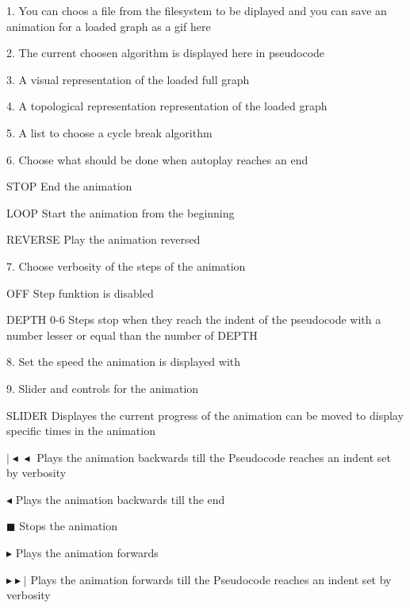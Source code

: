 \begin{list}{-}{}
\item[1.] You can choos a file from the filesystem to be diplayed and you can save an animation for a loaded graph as a gif here
\item[2.] The current choosen algorithm is displayed here in pseudocode
\item[3.] A visual representation of the loaded full graph
\item[4.] A topological representation representation of the loaded graph
\item[5.] A list to choose a cycle break algorithm
\item[6.] Choose what should be done when autoplay reaches an end
\begin{list}{-}{}
\item[STOP] End the animation
\item[LOOP] Start the animation from the beginning
\item[REVERSE] Play the animation reversed
\end{list}
\item[7.] Choose verbosity of the steps of the animation
\begin{list}{-}{}
\item[OFF] Step funktion is disabled
\item[DEPTH 0-6] Steps stop when they reach the indent of the pseudocode with a number lesser or equal than the number of DEPTH
\end{list}
\item[8.] Set the speed the animation is displayed with
\item[9.] Slider and controls for the animation
\begin{list}{-}{}
\item[SLIDER] Displayes the current progress of the animation can be moved to display specific times in the animation
\item[ $| \! \! \! \blacktriangleleft \! \blacktriangleleft$ ] Plays the animation backwards till the Pseudocode reaches an indent set by verbosity
\item[ $\blacktriangleleft$ ] Plays the animation backwards till the end
\item[$ \blacksquare $] Stops the animation
\item[$ \blacktriangleright $] Plays the animation forwards
\item[$ \blacktriangleright \! \blacktriangleright \! \! \!|$]  Plays the animation forwards till the Pseudocode reaches an indent set by verbosity
\end{list}
\end{list}